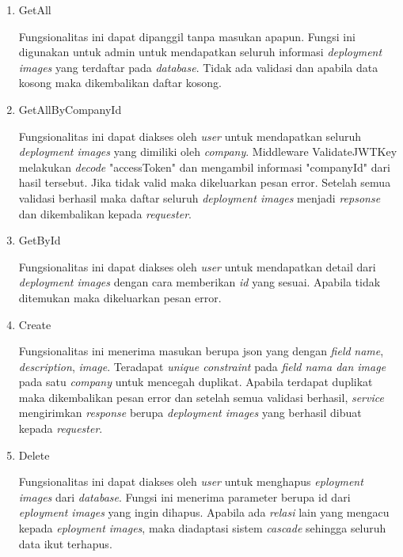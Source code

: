 \begin{enumerate}
  \item GetAll

        Fungsionalitas ini dapat dipanggil tanpa masukan apapun. Fungsi ini digunakan untuk admin untuk mendapatkan seluruh informasi \textit{deployment images} yang terdaftar pada \textit{database}. Tidak ada validasi dan apabila data kosong maka dikembalikan daftar kosong.

  \item GetAllByCompanyId

        Fungsionalitas ini dapat diakses oleh \textit{user} untuk mendapatkan seluruh \textit{deployment images} yang dimiliki oleh \textit{company}. Middleware ValidateJWTKey  melakukan \textit{decode} "accessToken" dan mengambil informasi "companyId" dari hasil tersebut. Jika tidak valid maka dikeluarkan pesan error. Setelah semua validasi berhasil maka daftar seluruh \textit{deployment images} menjadi \textit{repsonse} dan dikembalikan kepada \textit{requester}.

  \item GetById

        Fungsionalitas ini dapat diakses oleh \textit{user} untuk mendapatkan detail dari \textit{deployment images} dengan cara memberikan \textit{id} yang sesuai. Apabila tidak ditemukan maka dikeluarkan pesan error.

  \item Create

        Fungsionalitas ini menerima masukan berupa json yang dengan \textit{field} \textit{name}, \textit{description}, \textit{image}. Teradapat \textit{unique constraint} pada \textit{field nama dan image} pada satu \textit{company} untuk mencegah duplikat. Apabila terdapat duplikat maka dikembalikan pesan error dan setelah semua validasi berhasil, \textit{service} mengirimkan \textit{response} berupa \textit{deployment images} yang berhasil dibuat kepada \textit{requester}.

  \item Delete

        Fungsionalitas ini dapat diakses oleh \textit{user} untuk menghapus \textit{eployment images} dari \textit{database}. Fungsi ini menerima parameter berupa id dari \textit{eployment images} yang ingin dihapus. Apabila ada \textit{relasi} lain yang mengacu kepada \textit{eployment images}, maka diadaptasi sistem \textit{cascade} sehingga seluruh data ikut terhapus.

\end{enumerate}

